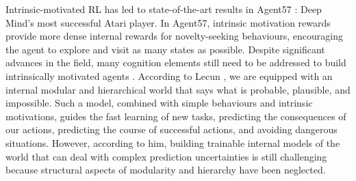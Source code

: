 Intrinsic-motivated RL has led to state-of-the-art results in Agent57 \cite{badia2020agent57}: Deep Mind’s most successful Atari player. In Agent57, intrinsic motivation rewards provide more dense internal rewards for novelty-seeking behaviours, encouraging the agent to explore and visit as many states as possible. Despite significant advances in the field, many cognition elements still need to be addressed to build intrinsically motivated agents \cite{hao2023exploration}\cite{aubret2019survey}. According to Lecun \cite{lecun2022path}, we are equipped with an internal modular and hierarchical world that says what is probable, plausible, and impossible. Such a model, combined with simple behaviours and intrinsic motivations, guides the fast learning of new tasks, predicting the consequences of our actions, predicting the course of successful actions, and avoiding dangerous situations. However, according to him, building trainable internal models of the world that can deal with complex prediction uncertainties is still challenging because structural aspects of modularity and hierarchy have been neglected. 

